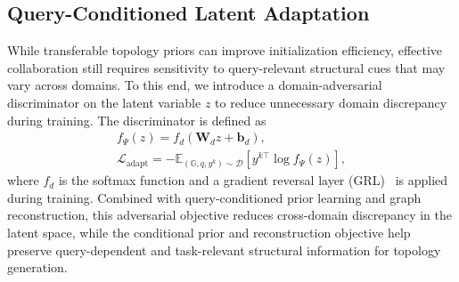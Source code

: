 \documentclass[lettersize,journal]{IEEEtran}
\theoremstyle{plain}
\begin{document}
\subsection{Query-Conditioned Latent Adaptation}
While transferable topology priors can improve initialization efficiency, effective collaboration still requires sensitivity to query-relevant structural cues that may vary across domains. To this end, we introduce a domain-adversarial discriminator on the latent variable $z$ to reduce unnecessary domain discrepancy during training. The discriminator is defined as
\begin{gather}
f_\Psi(z)=f_d(\mathbf{W}_d z+\mathbf{b}_d),\\
\mathcal{L}_{\mathrm{adapt}}
=
-
\mathbb{E}_{(\mathbb{G},q,y^k)\sim\mathcal{D}}
\left[y^{k\top}\log f_\Psi(z)\right],
\end{gather}
where $f_d$ is the softmax function and a gradient reversal layer (GRL)~\cite{DBLP:conf/icml/GaninL15} is applied during training. Combined with query-conditioned prior learning and graph reconstruction, this adversarial objective reduces cross-domain discrepancy in the latent space, while the conditional prior and reconstruction objective help preserve query-dependent and task-relevant structural information for topology generation.
\end{document}

